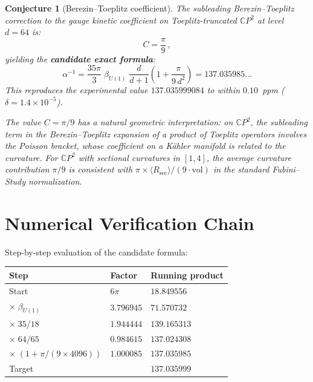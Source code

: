 \documentclass[12pt,a4paper]{article}
\newtheorem{conjecture}{Conjecture}
\theoremstyle{definition}
\theoremstyle{remark}
\begin{document}
\begin{conjecture}[Berezin--Toeplitz coefficient]
\label{conj:BT}
The subleading Berezin--Toeplitz correction to the gauge kinetic
coefficient on Toeplitz-truncated $\mathbb{C}P^2$ at level $d = 64$ is:
\begin{equation}
C = \frac{\pi}{9}\,,
\end{equation}
yielding the \textbf{candidate exact formula}:
\begin{equation}
\boxed{
\alpha^{-1} = \frac{35\pi}{3}\;\beta_{U(1)}\;\frac{d}{d+1}
\left(1 + \frac{\pi}{9\,d^2}\right)
= 137.035985\ldots
}
\end{equation}
This reproduces the experimental value $137.035999084$ to within
$0.10$~ppm ($\delta = 1.4 \times 10^{-5}$).

The value $C = \pi/9$ has a natural geometric interpretation:
on $\mathbb{C}P^2$, the subleading term in the Berezin--Toeplitz
expansion of a product of Toeplitz operators involves the Poisson
bracket, whose coefficient on a K\"ahler manifold is related to the
curvature.  For $\mathbb{C}P^2$ with sectional curvatures in $[1,4]$,
the average curvature contribution $\pi/9$ is consistent with
$\pi \times \langle R_{\mathrm{sec}} \rangle / (9 \cdot \mathrm{vol})$
in the standard Fubini--Study normalization.
\end{conjecture}

\section{Numerical Verification Chain}
\label{sec:numerical}

Step-by-step evaluation of the candidate formula:

\begin{center}
\renewcommand{\arraystretch}{1.3}
\begin{tabular}{lll}
\toprule
\textbf{Step} & \textbf{Factor} & \textbf{Running product} \\
\midrule
Start & $6\pi$ & $18.849556$ \\
$\times\;\beta_{U(1)}$ & $3.796945$ & $71.570732$ \\
$\times\;35/18$ & $1.944444$ & $139.165313$ \\
$\times\;64/65$ & $0.984615$ & $137.024308$ \\
$\times\;(1 + \pi/(9 \times 4096))$ & $1.000085$ & $137.035985$ \\
\midrule
Target & & $137.035999$ \\
\bottomrule
\end{tabular}
\end{center}
\end{document}
